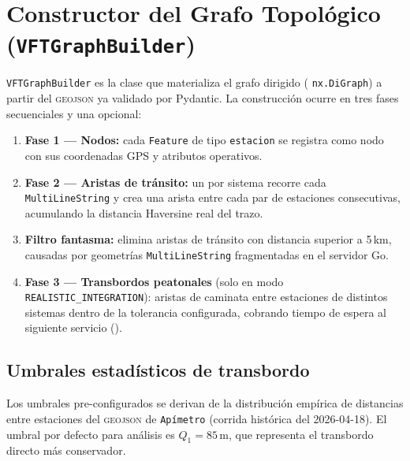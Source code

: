 
\section{Constructor del Grafo Topológico (\texttt{VFTGraphBuilder})}
\label{anx:vft-graphbuilder}

\texttt{VFTGraphBuilder} es la clase que materializa el grafo dirigido (
\texttt{nx.DiGraph}) a partir del \textsc{geojson} ya validado por Pydantic. La
construcción ocurre en tres fases secuenciales y una opcional:

\begin{enumerate}
    \item \textbf{Fase 1 — Nodos:} cada \texttt{Feature} de tipo
    \texttt{estacion} se registra como nodo con sus coordenadas GPS y
    atributos operativos.
    \item \textbf{Fase 2 — Aristas de tránsito:} un  por
    sistema recorre cada \texttt{MultiLineString} y crea una arista entre
    cada par de estaciones consecutivas, acumulando la distancia Haversine
    real del trazo.
    \item \textbf{Filtro fantasma:} elimina aristas de tránsito con
    distancia superior a 5\,km, causadas por geometrías
    \texttt{MultiLineString} fragmentadas en el servidor Go.
    \item \textbf{Fase 3 — Transbordos peatonales} (solo en modo
    \texttt{REALISTIC\_INTEGRATION}): aristas de caminata entre estaciones
    de distintos sistemas dentro de la tolerancia configurada, cobrando
    tiempo de espera al siguiente servicio ().
\end{enumerate}

\subsection*{Umbrales estadísticos de transbordo}

Los umbrales pre-configurados se derivan de la distribución empírica de
distancias entre estaciones del \textsc{geojson} de \texttt{Apímetro} (corrida
histórica del 2026-04-18). El umbral por defecto para análisis es $Q_1 = 85$\,m, que
representa el transbordo directo más conservador.

